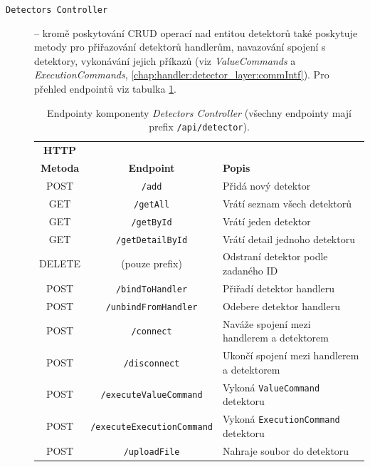 \begin{description}
    \item[\texttt{Detectors Controller}] -- kromě poskytování CRUD operací nad entitou detektorů také poskytuje metody pro přiřazování detektorů handlerům, navazování spojení s detektory, vykonávání jejich příkazů (viz \textit{ValueCommands} a \textit{ExecutionCommands}, \ref{chap:handler:detector_layer:commIntf}). Pro přehled endpointů viz tabulka \ref{tab:master:api_detectors}.

    \begin{table}[h!]
        \begin{center}
            \begin{tabular}{|c|c|l|}
                \hline
          \textbf{HTTP} & & \\
          \textbf{Metoda} & \textbf{Endpoint} & \textbf{Popis} \\
            \hline
            POST & \texttt{/add} & Přidá nový detektor \\
            GET & \texttt{/getAll} & Vrátí seznam všech detektorů \\
            GET & \texttt{/getById} & Vrátí jeden detektor \\
            GET & \texttt{/getDetailById} & Vrátí detail jednoho detektoru \\
            DELETE & (pouze prefix) & Odstraní detektor podle zadaného ID \\
            POST & \texttt{/bindToHandler} & Přiřadí detektor handleru \\
            POST & \texttt{/unbindFromHandler} & Odebere detektor handleru \\
            POST & \texttt{/connect} & Naváže spojení mezi handlerem a detektorem \\
            POST & \texttt{/disconnect} & Ukončí spojení mezi handlerem a detektorem \\
            POST & \texttt{/executeValueCommand} & Vykoná \texttt{ValueCommand} detektoru \\
            POST & \texttt{/executeExecutionCommand} & Vykoná \texttt{ExecutionCommand} detektoru \\
            POST & \texttt{/uploadFile} & Nahraje soubor do detektoru \\
            \hline
            \end{tabular}
        \end{center}
        \caption{Endpointy komponenty \textit{Detectors Controller} (všechny endpointy mají prefix \texttt{/api/detector}).}
        \label{tab:master:api_detectors}
    \end{table}    


\end{description}
